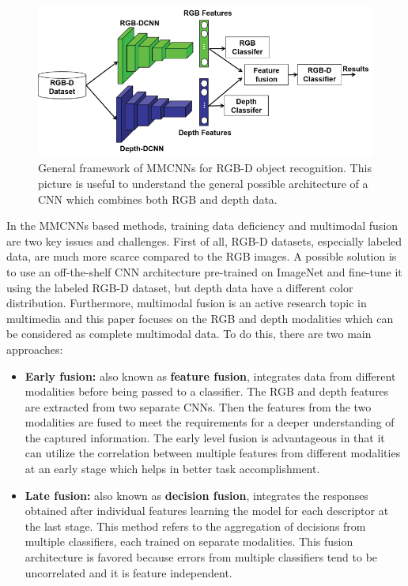 \begin{figure}[h!]
	\centering
	\includegraphics[width=0.8\linewidth]{images/cnn_rgb_depth.png}
	\caption{General framework of MMCNNs for RGB-D object recognition. This picture is useful to understand the general possible  architecture of a CNN which combines both RGB and depth data.}
\end{figure} 

In the MMCNNs based methods, training data deficiency and multimodal fusion are two key issues and challenges. First of all, RGB-D datasets, especially labeled data, are much more scarce compared to the RGB images. A possible solution  is to use an off-the-shelf CNN architecture pre-trained
on ImageNet and fine-tune it using the labeled RGB-D dataset, but depth data have a different color distribution. Furthermore, multimodal fusion is an active research topic in multimedia and this paper focuses on the RGB and depth modalities which can be considered as complete multimodal data. To do this, there are two main approaches: 

\begin{itemize}
	\item \textbf{Early fusion:} also known as \textbf{feature fusion}, integrates data from different modalities before being passed to a classifier. The RGB and depth features are extracted from two separate CNNs. Then the features from the two modalities are fused to meet the requirements for a deeper understanding of the captured information. The early level fusion is advantageous in that it can utilize the correlation between multiple features from different modalities at an early stage which helps in better task accomplishment.
	\item \textbf{Late fusion:} also known as \textbf{decision fusion}, integrates the responses obtained after individual features learning the model for each descriptor at the last stage. This method refers to the aggregation of decisions from multiple classifiers, each trained on separate modalities. This fusion architecture is favored because errors from multiple classifiers tend to be uncorrelated and it is feature independent.
\end{itemize}

